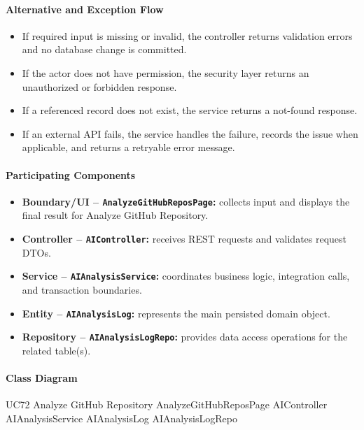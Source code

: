 \paragraph{Alternative and Exception Flow}

\begin{itemize}
    \item If required input is missing or invalid, the controller returns validation errors and no database change is committed.
    \item If the actor does not have permission, the security layer returns an unauthorized or forbidden response.
    \item If a referenced record does not exist, the service returns a not-found response.
    \item If an external API fails, the service handles the failure, records the issue when applicable, and returns a retryable error message.
\end{itemize}

\paragraph{Participating Components}

\begin{itemize}
    \item \textbf{Boundary/UI -- \texttt{AnalyzeGitHubReposPage}:} collects input and displays the final result for Analyze GitHub Repository.
    \item \textbf{Controller -- \texttt{AIController}:} receives REST requests and validates request DTOs.
    \item \textbf{Service -- \texttt{AIAnalysisService}:} coordinates business logic, integration calls, and transaction boundaries.
    \item \textbf{Entity -- \texttt{AIAnalysisLog}:} represents the main persisted domain object.
    \item \textbf{Repository -- \texttt{AIAnalysisLogRepo}:} provides data access operations for the related table(s).
\end{itemize}

\paragraph{Class Diagram}

\ClassDiagram
{UC72 Analyze GitHub Repository}
{AnalyzeGitHubReposPage}
{AIController}
{AIAnalysisService}
{AIAnalysisLog}
{AIAnalysisLogRepo}

